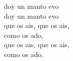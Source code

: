 \begin{cancion}%
	 doy un manto evo \\
	 doy un manto evo \\
	que os ais, que os ais,  \\
	como os ado,\\
	que os ais, que os ais,  \\
	como os ado.\\
\end{cancion}%
